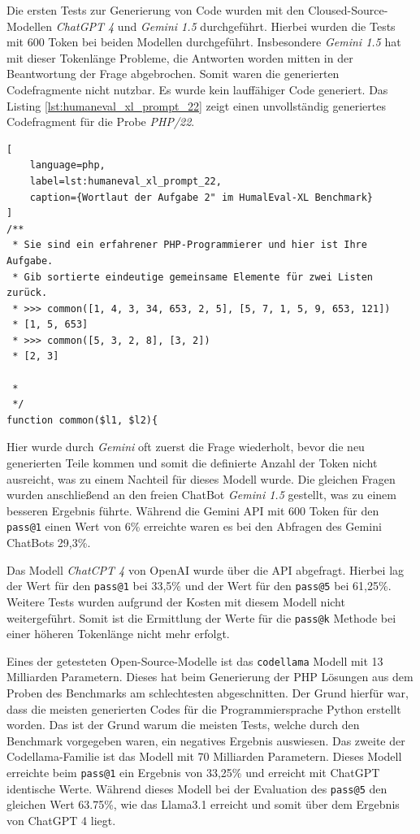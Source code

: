 Die ersten Tests zur Generierung von Code wurden mit den Cloused-Source-Modellen \textit{ChatGPT 4} und \textit{Gemini 1.5} durchgeführt. Hierbei wurden die Tests mit 600 Token bei beiden Modellen durchgeführt. Insbesondere \textit{Gemini 1.5} hat mit dieser Tokenlänge Probleme, die Antworten worden mitten in der Beantwortung der Frage abgebrochen. Somit waren die generierten Codefragmente nicht nutzbar. Es wurde kein lauffähiger Code generiert. Das Listing \ref{lst:humaneval_xl_prompt_22} zeigt einen unvollständig generiertes Codefragment für die Probe \textit{PHP/22}.

\begin{lstlisting}[
	language=php,
	label=lst:humaneval_xl_prompt_22,
	caption={Wortlaut der Aufgabe 2" im HumalEval-XL Benchmark}
]
/**
 * Sie sind ein erfahrener PHP-Programmierer und hier ist Ihre Aufgabe.
 * Gib sortierte eindeutige gemeinsame Elemente für zwei Listen zurück.
 * >>> common([1, 4, 3, 34, 653, 2, 5], [5, 7, 1, 5, 9, 653, 121])
 * [1, 5, 653]
 * >>> common([5, 3, 2, 8], [3, 2])
 * [2, 3]

 *
 */
function common($l1, $l2){
\end{lstlisting}

Hier wurde durch \textit{Gemini} oft zuerst die Frage wiederholt, bevor die neu generierten Teile kommen und somit die definierte Anzahl der Token nicht ausreicht, was zu einem Nachteil für dieses Modell wurde. Die gleichen Fragen wurden anschließend an den freien ChatBot \textit{Gemini 1.5} gestellt, was zu einem besseren Ergebnis führte. Während die Gemini API mit 600 Token für den \texttt{pass@1} einen Wert von 6\% erreichte waren es bei den Abfragen des Gemini ChatBots 29,3\%.\vspace{0.2cm}

Das Modell \textit{ChatCPT 4} von OpenAI wurde über die API abgefragt. Hierbei lag der Wert für den \texttt{pass@1} bei 33,5\% und der Wert für den \texttt{pass@5} bei 61,25\%. Weitere Tests wurden aufgrund der Kosten mit diesem Modell nicht weitergeführt. Somit ist die Ermittlung der Werte für die \texttt{pass@k} Methode bei einer höheren Tokenlänge nicht mehr erfolgt.\vspace{0.2cm}

Eines der getesteten Open-Source-Modelle ist das \texttt{codellama} Modell mit 13 Milliarden Parametern. Dieses hat beim Generierung der PHP Lösungen aus dem Proben des Benchmarks am schlechtesten abgeschnitten. Der Grund hierfür war, dass die meisten generierten Codes für die Programmiersprache Python erstellt worden. Das ist der Grund warum die meisten Tests, welche durch den Benchmark vorgegeben waren, ein negatives Ergebnis auswiesen. Das zweite der Codellama-Familie ist das Modell mit 70 Milliarden Parametern. Dieses Modell erreichte beim \texttt{pass@1} ein Ergebnis von 33,25\% und erreicht mit ChatGPT identische Werte. Während dieses Modell bei der Evaluation des \texttt{pass@5} den gleichen Wert 63.75\%, wie das Llama3.1 erreicht und somit über dem Ergebnis von ChatGPT 4 liegt.\vspace{0.2cm}

